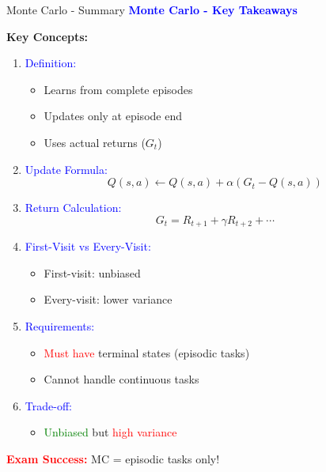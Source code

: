 \documentclass[8pt]{beamer}
\begin{document}
\begin{frame}{Monte Carlo - Summary}
\fontsize{6.5}{7.5}\selectfont
\textcolor{blue}{\textbf{Monte Carlo - Key Takeaways}}

\textbf{Key Concepts:}
\begin{enumerate}
\item \textcolor{blue}{Definition:}
\begin{itemize}
\item Learns from complete episodes
\item Updates only at episode end
\item Uses actual returns ($G_t$)
\end{itemize}

\item \textcolor{blue}{Update Formula:}
\[
Q(s,a) \leftarrow Q(s,a) + \alpha(G_t - Q(s,a))
\]

\item \textcolor{blue}{Return Calculation:}
\[
G_t = R_{t+1} + \gamma R_{t+2} + \cdots
\]

\item \textcolor{blue}{First-Visit vs Every-Visit:}
\begin{itemize}
\item First-visit: unbiased
\item Every-visit: lower variance
\end{itemize}

\item \textcolor{blue}{Requirements:}
\begin{itemize}
\item \textcolor{red}{Must have} terminal states (episodic tasks)
\item Cannot handle continuous tasks
\end{itemize}

\item \textcolor{blue}{Trade-off:}
\begin{itemize}
\item \textcolor{green}{Unbiased} but \textcolor{red}{high variance}
\end{itemize}
\end{enumerate}

\textcolor{red}{\textbf{Exam Success:}} MC = episodic tasks only!
\end{frame}

\end{document}

